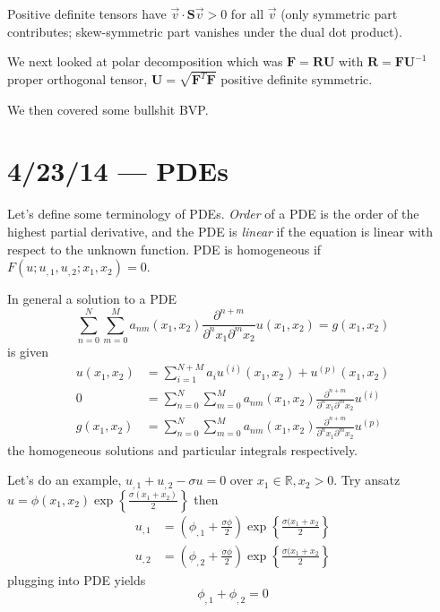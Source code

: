 \documentclass[10pt]{report}
\begin{document}
Positive definite tensors have $\vec{v} \cdot \mathbf{S}\vec{v} > 0$ for all $\vec{v}$ (only symmetric part contributes; skew-symmetric part vanishes under the dual dot product).

We next looked at polar decomposition which was $\mathbf{F} = \mathbf{RU}$ with $\mathbf{R} = \mathbf{F} \mathbf{U}^{-1}$ proper orthogonal tensor, $\mathbf{U} = \sqrt{\mathbf{F}^T\mathbf{F}}$ positive definite symmetric. 

We then covered some bullshit BVP.
\chapter{4/23/14 --- PDEs}

Let's define some terminology of PDEs. \emph{Order} of a PDE is the order of the highest partial derivative, and the PDE is \emph{linear} if the equation is linear with respect to the unknown function. PDE is homogeneous if $F(u; u_{,1}, u_{,2}; x_1, x_2) = 0$.

In general a solution to a PDE
\begin{equation}
    \sum_{n=0}^{N}\sum_{m=0}^{M}a_{nm}(x_1, x_2)\frac{\partial^{n+m}}{\partial^nx_1\partial^mx_2}u(x_1, x_2) = g(x_1, x_2)
\end{equation}
is given
\begin{align}
    u(x_1, x_2) &= \sum_{i=1}^{N+M} a_iu^{(i)}(x_1, x_2) + u^{(p)}(x_1, x_2)\\
    0 &= \sum_{n=0}^{N}\sum_{m=0}^{M}a_{nm}(x_1, x_2) \frac{\partial^{n+m}}{\partial^nx_1\partial^mx_2}u^{(i)}\\
    g(x_1, x_2) &= \sum_{n=0}^{N}\sum_{m=0}^{M}a_{nm}(x_1, x_2) \frac{\partial^{n+m}}{\partial^nx_1\partial^mx_2}u^{(p)}
\end{align}
the homogeneous solutions and particular integrals respectively.

Let's do an example, $u_{,1} + u_{,2} - \sigma u = 0$ over $x_1 \in \mathbb{R}, x_2 > 0$. Try ansatz $u = \phi(x_1, x_2)\exp\left\{ \frac{\sigma(x_1 + x_2)}{2} \right\}$ then
\begin{align}
    u_{,1} &= \left(\phi_{,1} + \frac{\sigma\phi}{2}\right)\exp\left\{ \frac{\sigma(x_1 + x_2}{2} \right\}\\
    u_{,2} &= \left(\phi_{,2} + \frac{\sigma\phi}{2}\right)\exp\left\{ \frac{\sigma(x_1 + x_2}{2} \right\}
\end{align}
plugging into PDE yields
\begin{equation}
    \phi_{,1} + \phi_{,2} = 0
\end{equation}
\end{document}
